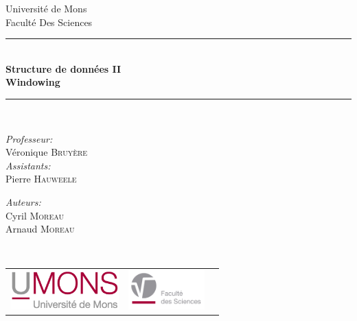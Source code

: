 \documentclass{article}
\begin{document}
\begin{titlepage}
    \begin{center}
        
        {\Large Université de Mons}\\[1ex]
        {\Large Faculté Des Sciences}\\[1ex]
        
        \newcommand{\HRule}{\rule{\linewidth}{0.3mm}}
        \HRule \\[0.5cm]
        { \LARGE \bfseries Structure de données II \\[0.3cm]}
        { \LARGE \bfseries Windowing\\[0.05cm]} %
        \HRule \\[1.5cm]
        
        \begin{minipage}[t]{0.45\textwidth}
            \begin{flushleft} \large
                \emph{Professeur:}\\
                Véronique \textsc{Bruyère}\\
                \emph{Assistants:}\\
                Pierre \textsc{Hauweele}\\
            \end{flushleft}
        \end{minipage}
        \begin{minipage}[t]{0.45\textwidth}
            \begin{flushright} \large
                \emph{Auteurs:} \\
                Cyril \textsc{Moreau} \\
                Arnaud \textsc{Moreau}
            \end{flushright}
        \end{minipage}\\[2ex]
        
        \vfill
        
        \begin{center}
            \begin{tabular}[t]{c c c}
                \includegraphics[height=1.5cm]{img/UMONS-Logo.jpg} &
                \includegraphics[height=1.5cm]{img/FS-Logo.jpg} &
            \end{tabular}
        \end{center}~\\
        

\end{center}
\end{titlepage}
\end{document}
